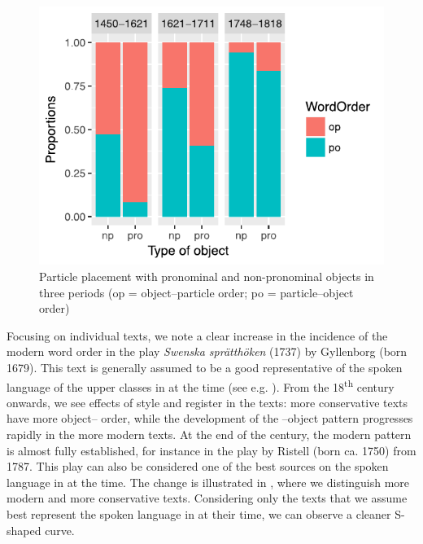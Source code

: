 \documentclass[output=paper]{langscibook}
\begin{document}
  
\begin{figure}
\includegraphics[width=.75\textwidth]{figures/a4-img001.pdf}
\caption{Particle placement with pronominal and non-pronominal objects in three periods (op = object–particle order; po = particle–object order)\label{fig:lalu:1}} 
\end{figure}


Focusing on individual texts, we note a clear increase in the incidence of the modern word order in the play \textit{Swenska sprätthöken} (1737) by Gyllenborg (born 1679). This text is generally assumed to be a good representative of the spoken language of the upper classes in  at the time (see e.g. \citealt{Widmark2000}). From the 18\textsuperscript{th} century onwards, we see effects of style and register in the texts: more conservative texts have more object– order, while the development of the –object pattern progresses rapidly in the more modern texts. At the end of the century, the modern pattern is almost fully established, for instance in the play by Ristell (born ca. 1750) from 1787. This play can also be considered one of the best sources on the spoken language in  at the time. The change is illustrated in , where we distinguish more modern and more conservative texts. Considering only the texts that we assume best represent the spoken language in  at their time, we can observe a cleaner S-shaped curve.
\end{document}
